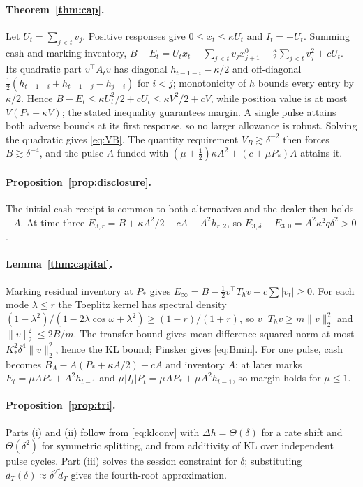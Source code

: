 \documentclass[12pt]{article}
\theoremstyle{definition}
\theoremstyle{remark}
\begin{document}
\paragraph{Theorem~\ref{thm:cap}.} Let $U_t=\sum_{j<t}v_j$. Positive responses give $0\le x_t\le\kappa U_t$ and $I_t=-U_t$. Summing cash and marking inventory, $B-E_t=U_tx_t-\sum_{j<t}v_jx^0_{j+1}-\tfrac\kappa2\sum_{j<t}v_j^2+cU_t$. Its quadratic part $v^\top A_tv$ has diagonal $h_{t-1-i}-\kappa/2$ and off-diagonal $\tfrac12(h_{t-1-i}+h_{t-1-j}-h_{j-i})$ for $i<j$; monotonicity of $h$ bounds every entry by $\kappa/2$. Hence $B-E_t\le\kappa U_t^2/2+cU_t\le\kappa V^2/2+cV$, while position value is at most $V(P_*+\kappa V)$; the stated inequality guarantees margin. A single pulse attains both adverse bounds at its first response, so no larger allowance is robust. Solving the quadratic gives \eqref{eq:VB}. The quantity requirement $V_B\gtrsim\delta^{-2}$ then forces $B\gtrsim\delta^{-4}$, and the pulse $A$ funded with $(\mu+\tfrac12)\kappa A^2+(c+\mu P_*)A$ attains it.

\paragraph{Proposition~\ref{prop:disclosure}.} The initial cash receipt is common to both alternatives and the dealer then holds $-A$. At time three $E_{3,r}=B+\kappa A^2/2-cA-A^2h_{r,2}$, so $E_{3,\delta}-E_{3,0}=A^2\kappa^2q\delta^2>0$.

\paragraph{Lemma~\ref{thm:capital}.} Marking residual inventory at $P_*$ gives $E_\infty=B-\tfrac12v^\top T_hv-c\sum|v_t|\ge0$. For each mode $\lambda\le r$ the Toeplitz kernel has spectral density $(1-\lambda^2)/(1-2\lambda\cos\omega+\lambda^2)\ge(1-r)/(1+r)$, so $v^\top T_hv\ge m\|v\|_2^2$ and $\|v\|_2^2\le2B/m$. The transfer bound gives mean-difference squared norm at most $K_*^2\delta^4\|v\|_2^2$, hence the KL bound; Pinsker gives \eqref{eq:Bmin}. For one pulse, cash becomes $B_A-A(P_*+\kappa A/2)-cA$ and inventory $A$; at later marks $E_t=\mu AP_*+A^2h_{t-1}$ and $\mu|I_t|P_t=\mu AP_*+\mu A^2h_{t-1}$, so margin holds for $\mu\le1$.

\paragraph{Proposition~\ref{prop:tri}.} Parts (i) and (ii) follow from \eqref{eq:klconv} with $\Delta h=\Theta(\delta)$ for a rate shift and $\Theta(\delta^2)$ for symmetric splitting, and from additivity of KL over independent pulse cycles. Part (iii) solves the session constraint for $\delta$; substituting $d_T(\delta)\approx\delta^2\tilde d_T$ gives the fourth-root approximation.
\end{document}
